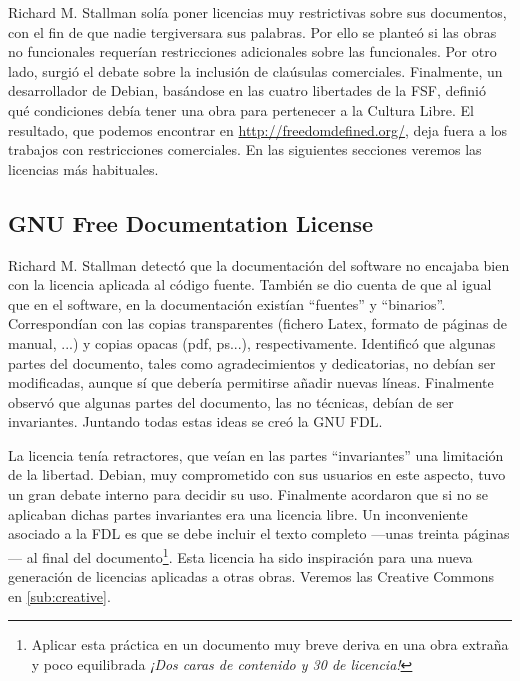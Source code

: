 Richard M. Stallman solía poner licencias muy restrictivas sobre sus
documentos, con el fin de que nadie tergiversara sus palabras. Por
ello se planteó si las obras no funcionales requerían restricciones
adicionales sobre las funcionales. Por otro lado, surgió el debate
sobre la inclusión de claúsulas comerciales. Finalmente, un
desarrollador de Debian, basándose en las cuatro libertades de la FSF,
definió qué condiciones debía tener una obra para pertenecer a la
Cultura Libre. El resultado, que podemos encontrar en
\url{http://freedomdefined.org/}, deja fuera a los trabajos con
restricciones comerciales. En las siguientes secciones veremos las
licencias más habituales.

\subsection{GNU Free Documentation License}

Richard M. Stallman detectó que la documentación del software no
encajaba bien con la licencia aplicada al código fuente. También se
dio cuenta de que al igual que en el software, en la documentación
existían ``fuentes'' y ``binarios''. Correspondían con las copias
transparentes (fichero Latex, formato de páginas de manual, ...) y
copias opacas (pdf, ps...), respectivamente. Identificó que algunas
partes del documento, tales como agradecimientos y dedicatorias, no
debían ser modificadas, aunque sí que debería permitirse añadir nuevas
líneas. Finalmente observó que algunas partes del documento, las no
técnicas, debían de ser invariantes. Juntando todas estas ideas se
creó la GNU FDL.

La licencia tenía retractores, que veían en las partes ``invariantes''
una limitación de la libertad. Debian, muy comprometido con sus
usuarios en este aspecto, tuvo un gran debate interno para decidir su
uso. Finalmente acordaron que si no se aplicaban dichas partes
invariantes era una licencia libre. Un inconveniente asociado a la FDL
es que se debe incluir el texto completo ---unas treinta páginas--- al
final del documento\footnote{Aplicar esta práctica en un documento muy
  breve deriva en una obra extraña y poco equilibrada \emph{¡Dos caras
    de contenido y 30 de licencia!}}. Esta licencia ha sido
inspiración para una nueva generación de licencias aplicadas a otras
obras. Veremos las Creative Commons en \ref{sub:creative}.

